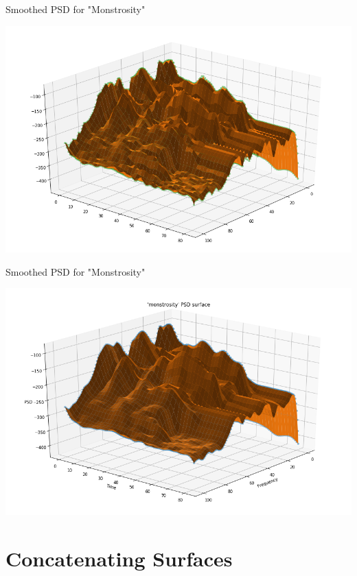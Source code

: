 \documentclass[14pt,aspectratio=169, serif, dvipsnames]{beamer}
\begin{document}
\begin{frame}{Smoothed PSD for "Monstrosity"}
    \begin{center}
        \includegraphics[scale=0.4]{pictures/monstrosity.png}
    \end{center}
\end{frame}

\begin{frame}{Smoothed PSD for "Monstrosity"}
    \begin{center}
        \includegraphics[scale=0.4]{pictures/smoother_monstrosity.png}
    \end{center}
\end{frame}

\section{Concatenating Surfaces}
\end{document}
